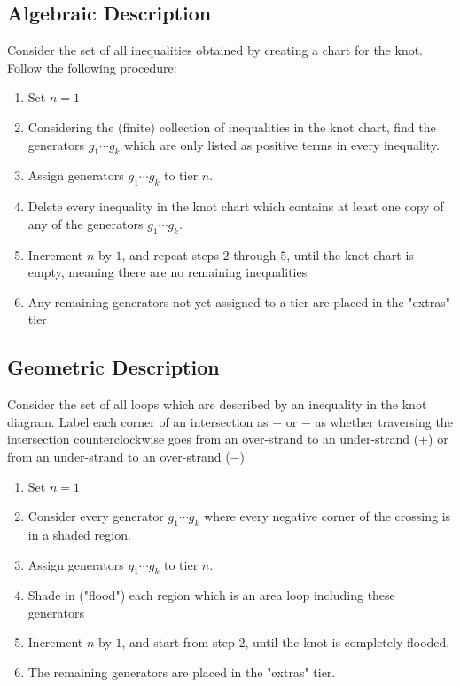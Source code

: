 \documentclass[11pt,oneside]{amsart}
\begin{document}
\subsection{Algebraic Description}
Consider the set of all inequalities obtained by creating a chart for the knot. Follow the following procedure:
\begin{algorithm}
\label{alg:AlgFlood}
    \begin{enumerate} 
        \item Set $n = 1$
        \item Considering the (finite) collection of inequalities in the knot chart, find the generators $g_1 \cdots g_k$ which are only listed as positive terms in every inequality.
        \item Assign generators $g_1 \cdots g_k$ to tier $n$.
        \item Delete every inequality in the knot chart which contains at least one copy of any of the generators $g_1 \cdots g_k$.
        \item Increment $n$ by $1$, and repeat steps $2$ through $5$, until the knot chart is empty, meaning there are no remaining inequalities
        \item Any remaining generators not yet assigned to a tier are placed in the "extras" tier
    \end{enumerate}
\end{algorithm}

\subsection{Geometric Description}

Consider the set of all loops which are described by an inequality in the knot diagram. Label each corner of an intersection as $+$ or $-$ as whether traversing the intersection counterclockwise goes from an over-strand to an under-strand ($+$) or from an under-strand to an over-strand ($-$)

\begin{algorithm}
\label{alg:GeomFlood}
    \begin{enumerate} 
        \item Set $n = 1$
        \item Consider every generator $g_1 \cdots g_k$ where every negative corner of the crossing is in a shaded region. 
        \item Assign generators $g_1 \cdots g_k$ to tier $n$.
        \item Shade in ("flood") each region which is an area loop including these generators
        \item Increment $n$ by $1$, and start from step $2$, until the knot is completely flooded.
        \item The remaining generators are placed in the "extras" tier.
    \end{enumerate}
\end{algorithm}
\end{document}
